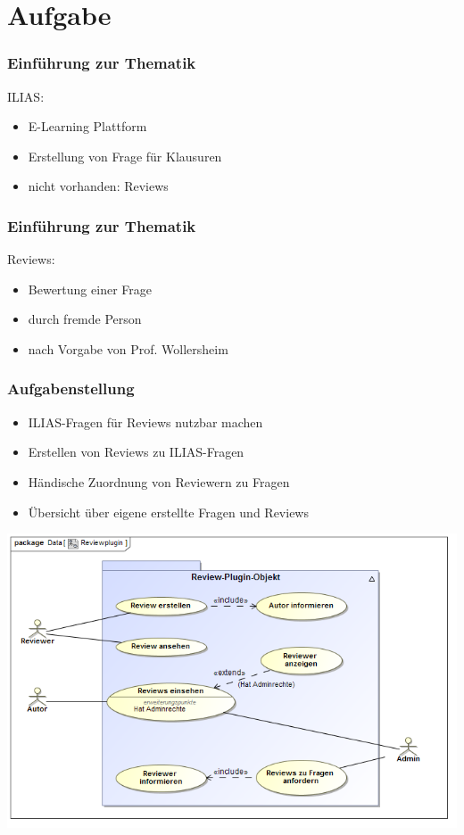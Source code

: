 \documentclass{beamer}
\begin{document}
	\section{Aufgabe}
		\begin{frame}
			\frametitle{Einführung zur Thematik}
			ILIAS:
			\begin{itemize}
  				\item E-Learning Plattform
  			 	\item Erstellung von Frage für Klausuren
  				\pause
  				\\
    			\item nicht vorhanden: Reviews
    		\end{itemize}
		\end{frame}
		\begin{frame}
			\frametitle{Einführung zur Thematik}
			Reviews:
			\begin{itemize}
				\item Bewertung einer Frage
				\item durch fremde Person
				\item nach Vorgabe von Prof. Wollersheim
			\end{itemize}
		\end{frame}
		\begin{frame}
			\frametitle{Aufgabenstellung}
			\begin{itemize}
				\item ILIAS-Fragen für Reviews nutzbar machen
				\pause
				\item Erstellen von Reviews zu ILIAS-Fragen
				\pause
				\item Händische Zuordnung von Reviewern zu Fragen
				\pause
				\item Übersicht über eigene erstellte Fragen und Reviews
			\end{itemize}
		\end{frame}
		\begin{frame}
			\begin{center}
				\includegraphics[scale=0.45]{Diagramme/Use_Case_Diagram__Reviewplugin.png}
				\label{Reviewplugin}
			\end{center}
		\end{frame}
\end{document}
